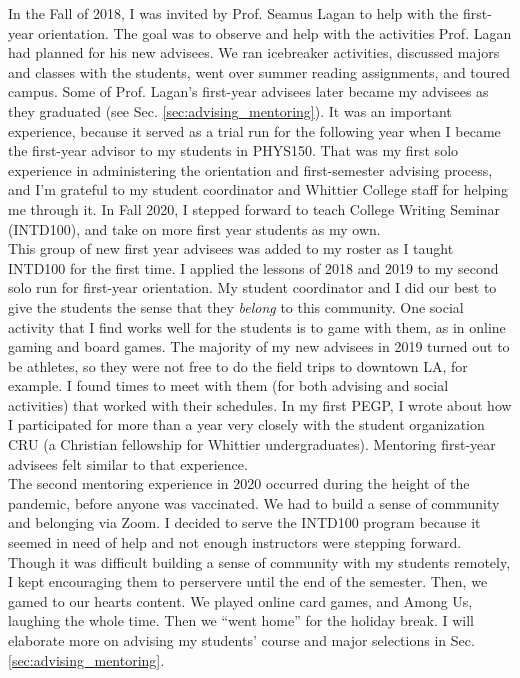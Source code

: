 \documentclass[../../../main.tex]{subfiles}
\begin{document}
\label{sec:first_year}

In the Fall of 2018, I was invited by Prof. Seamus Lagan to help with the first-year orientation.  The goal was to observe and help with the activities Prof. Lagan had planned for his new advisees.  We ran icebreaker activities, discussed majors and classes with the students, went over summer reading assignments, and toured campus.  Some of Prof. Lagan's first-year advisees later became my advisees as they graduated (see Sec. \ref{sec:advising_mentoring}).  It was an important experience, because it served as a trial run for the following year when I became the first-year advisor to my students in PHYS150.  That was my first solo experience in administering the orientation and first-semester advising process, and I'm grateful to my student coordinator and Whittier College staff for helping me through it.  In Fall 2020, I stepped forward to teach College Writing Seminar (INTD100), and take on more first year students as my own.
\\
\vspace{0.15cm}
This group of new first year advisees was added to my roster as I taught INTD100 for the first time.  I applied the lessons of 2018 and 2019 to my second solo run for first-year orientation.  My student coordinator and I did our best to give the students the sense that they \textit{belong} to this community.  One social activity that I find works well for the students is to game with them, as in online gaming and board games.  The majority of my new advisees in 2019 turned out to be athletes, so they were not free to do the field trips to downtown LA, for example.  I found times to meet with them (for both advising and social activities) that worked with their schedules.  In my first PEGP, I wrote about how I participated for more than a year very closely with the student organization CRU (a Christian fellowship for Whittier undergraduates).  Mentoring first-year advisees felt similar to that experience.
\\
\vspace{0.15cm}
The second mentoring experience in 2020 occurred during the height of the pandemic, before anyone was vaccinated.  We had to build a sense of community and belonging via Zoom.  I decided to serve the INTD100 program because it seemed in need of help and not enough instructors were stepping forward.  Though it was difficult building a sense of community with my students remotely, I kept encouraging them to perservere until the end of the semester.  Then, we gamed to our hearts content.  We played online card games, and Among Us, laughing the whole time.  Then we ``went home'' for the holiday break.  I will elaborate more on advising my students' course and major selections in Sec. \ref{sec:advising_mentoring}.
\end{document}
